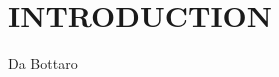 \section{\uppercase{Introduction}}
\label{sec:introduction}


\noindent Da Bottaro

\noindent 
\lipsum[2-4]

